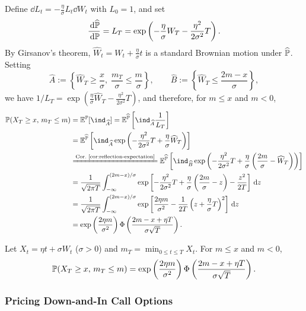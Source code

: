 Define $\dd L_t = -\frac{\eta}{\sigma} L_t \dd W_t$ with $L_0 = 1$, and set
\[
\frac{\,\mathrm{d}\widehat{\mathbb{P}}}{\,\mathrm{d}\mathbb{P}} = L_T = \exp\left(-\frac{\eta}{\sigma} W_T - \frac{\eta^2}{2\sigma^2} T\right).
\]
By Girsanov's theorem, $\widehat{W}_t = W_t + \frac{\eta}{\sigma} t$ is a standard Brownian motion under $\widehat{\mathbb{P}}$. Setting
\[
\widehat{A} := \left\{\widehat{W}_T \ge \frac{x}{\sigma},\; \frac{m_T}{\sigma} \le \frac{m}{\sigma}\right\}, \qquad \widehat{B} := \left\{\widehat{W}_T \le \frac{2m - x}{\sigma}\right\},
\]
we have $1/L_T = \exp\left(\frac{\eta}{\sigma}\widehat{W}_T - \frac{\eta^2}{2\sigma^2}T\right)$, and therefore, for $m \le x$ and $m < 0$,
\[
\begin{aligned}
    \Prob(X_T \ge x,\, m_T \le m) &= \E^{\Prob}[\ind_{\widehat{A}}] = \E^{\widehat{\Prob}}\left[\ind_{\widehat{A}}\frac{1}{L_T}\right] \\
    &= \E^{\widehat{\Prob}}\left[\ind_{\widehat{A}}\exp\left(-\frac{\eta^2}{2\sigma^2}T + \frac{\eta}{\sigma}\widehat{W}_T\right)\right] \\
    &\xlongequal{\text{Cor.~\ref{cor:reflection-expectation}}} \E^{\widehat{\Prob}}\left[\ind_{\widehat{B}}\exp\left(-\frac{\eta^2}{2\sigma^2}T + \frac{\eta}{\sigma}\left(\frac{2m}{\sigma} - \widehat{W}_T\right)\right)\right] \\
    &= \frac{1}{\sqrt{2\pi T}}\int_{-\infty}^{(2m - x)/\sigma} \exp\left[-\frac{\eta^2}{2\sigma^2}T + \frac{\eta}{\sigma}\left(\frac{2m}{\sigma} - z\right) - \frac{z^2}{2T}\right]\dd z \\
    &= \frac{1}{\sqrt{2\pi T}}\int_{-\infty}^{(2m - x)/\sigma} \exp\left[\frac{2\eta m}{\sigma^2} - \frac{1}{2T}\left(z + \frac{\eta}{\sigma}T\right)^2\right]\dd z \\
    &= \exp\left(\frac{2\eta m}{\sigma^2}\right)\Phi\left(\frac{2m - x + \eta T}{\sigma\sqrt{T}}\right).
\end{aligned}
\]

\begin{proposition}\label{prop:drifted-bm-min}
    Let $X_t = \eta t + \sigma W_t$ ($\sigma > 0$) and $m_T = \min_{0 \le t \le T} X_t$. For $m \le x$ and $m < 0$,
    \[
    \mathbb{P}(X_T \ge x,\, m_T \le m) = \exp\left(\frac{2\eta m}{\sigma^2}\right)\Phi\left(\frac{2m - x + \eta T}{\sigma\sqrt{T}}\right).
    \]
\end{proposition}

\subsubsection*{Pricing Down-and-In Call Options}

